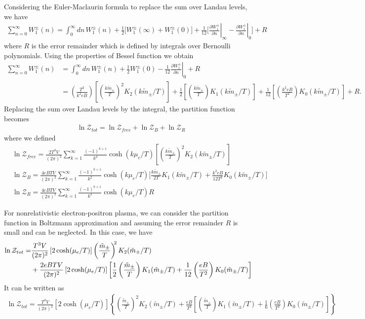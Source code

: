 \documentclass[Universe,article,submit,moreauthors,pdftex]{Definitions/mdpi}
\begin{document}
Considering the Euler-Maclaurin formula to replace the sum over Landau levels, we have
\begin{align}
\sum^{\infty}_{n=0}W^\pm_1(n)=\int^\infty_0\!\!dn\,W^\pm_1(n)+\frac{1}{2}\bigg[W^\pm_1(\infty)+W^\pm_1(0)\bigg]+\frac{1}{12}\bigg[\left.\frac{\partial W^\pm_1}{\partial n}\right|_{\infty}-\left.\frac{\partial W^\pm_1}{\partial n}\right|_{0}\bigg]+R
\end{align}
where $R$ is the error remainder which is defined by integrals over Bernoulli polynomials. Using the properties of Bessel function we obtain
\begin{align}
\sum^{\infty}_{n=0}W^\pm_1(n)&=\int^\infty_0\!\!dn\,W^\pm_1(n)+\frac{1}{2}W^\pm_1(0)-\frac{1}{12}\left.\frac{\partial W^\pm_1}{\partial n}\right|_{0}+R\\
&=\left(\frac{T^2}{k^2eB}\right)\left[\left(\frac{k\tilde{m}_\pm}{T}\right)^2K_2(k\tilde m_\pm/T)\right]+\frac{1}{2}\left[\left(\frac{k\tilde{m}_\pm}{T}\right)K_1(k\tilde m_\pm/T)\right]+\frac{1}{12}\left[\left(\frac{k^2eB}{T^2}\right)K_0(k\tilde m_\pm/T)\right]+R.
\end{align}
Replacing the sum over Landau levels by the integral, the partition function becomes
\begin{align}
&\ln\mathcal{Z}_{tot}=\ln\mathcal{Z}_{free}+\ln\mathcal{Z}_B+\ln\mathcal{Z}_R
\end{align}
where we defined 
\begin{align}
&\ln\mathcal{Z}_{free}=\frac{2T^3V}{(2\pi)^2}\sum^{\infty}_{k=1}\frac{(-1)^{k+1}}{k^4}\cosh{(k\mu_e/T)}\left[\left(\frac{k\tilde{m}_\pm}{T}\right)^2K_2(k\tilde m_\pm/T)\right]\\
&\ln\mathcal{Z}_B=\frac{4eBTV}{(2\pi)^2}\sum^{\infty}_{k=1}\frac{(-1)^{k+1}}{k^2}\cosh{(k\mu_e/T)}\bigg[\frac{k\tilde{m}_\pm}{2T}K_1(k\tilde m_\pm/T)+\frac{k^2eB}{12T^2}K_0(k\tilde m_\pm/T)\bigg]\\
&\ln\mathcal{Z}_R=\frac{4eBTV}{(2\pi)^2}\sum^{\infty}_{k=1}\frac{(-1)^{k+1}}{k^2}\cosh{(k\mu_e/T)}R
\end{align}
 
For nonrelativistic electron-positron plasma, we can consider the partition function in Boltzmann approximation and assuming the error remainder $R$ is small and can be neglected. In this case, we have
\begin{align}
\ln\mathcal{Z}_{tot}=&\frac{T^3V}{(2\pi)^2}\left[2\cosh(\mu_e/T)\right]\left(\frac{\tilde m_\pm}{T}\right)^{\!\!2} K_2(\tilde m_\pm/T)\notag\\
&+\frac{2eBTV}{(2\pi)^2}\left[2\cosh(\mu_e/T)\right]\left[\frac{1}{2}\left(\frac{\tilde m_\pm}{T}\right)K_1(\tilde m_\pm/T)+\frac{1}{12}\left(\frac{eB}{T^2}\right)K_0(\tilde m_\pm/T)\right]
\end{align}
It can be written as
\begin{align}\label{lnZ}
\ln\mathcal{Z}_{tot}=\frac{T^3V}{(2\pi)^2}\left[2\cosh(\mu_e/T)\right]\left\{\left(\frac{\tilde m_\pm}{T}\right)^{\!\!2} K_2(\tilde m_\pm/T)+\frac{eB}{T^2} \left[\left(\frac{\tilde m_\pm}{T}\right)K_1(\tilde m_\pm/T)+\frac{1}{6}\left(\frac{eB}{T^2}\right)K_0(\tilde m_\pm/T)\right]
\right\}
\end{align}
\end{document}
